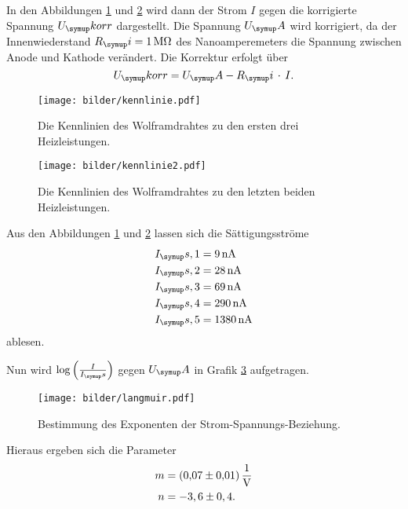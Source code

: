 In den Abbildungen \ref{fig:kenn} und \ref{fig:kenn1} wird dann der Strom $I$ gegen die korrigierte Spannung $U_\su{korr}$
dargestellt. Die Spannung $U_\su{A}$ wird korrigiert, da der Innenwiederstand
$R_\su{i} = \SI{1}{\mega\ohm}$ des Nanoamperemeters die Spannung zwischen
Anode und Kathode verändert. Die Korrektur erfolgt über
\begin{equation}
  U_\su{korr} = U_\su{A}-R_\su{i}\,\cdot\, I. \\
\end{equation}
\begin{figure}[H]
  \centering
  \texttt{[image: bilder/kennlinie.pdf]}
  \caption{Die Kennlinien des Wolframdrahtes zu den ersten drei Heizleistungen.}
  \label{fig:kenn}
\end{figure}
\begin{figure}[H]
  \centering
  \texttt{[image: bilder/kennlinie2.pdf]}
  \caption{Die Kennlinien des Wolframdrahtes zu den letzten beiden Heizleistungen.}
  \label{fig:kenn1}
\end{figure}
Aus den Abbildungen \ref{fig:kenn} und \ref{fig:kenn1} lassen sich die Sättigungsströme
\begin{align*}
  I_\su{s,1} &= \SI{9}{\nano\ampere}  \\
  I_\su{s,2} &= \SI{28}{\nano\ampere} \\
  I_\su{s,3} &= \SI{69}{\nano\ampere}  \\
  I_\su{s,4} &= \SI{290}{\nano\ampere}  \\
  I_\su{s,5} &= \SI{1380}{\nano\ampere}  \\
\end{align*}
ablesen.

Nun wird $\log{\left(\frac{I}{I_\su{s}}\right)}$ gegen $U_\su{A}$ in Grafik \ref{fig:langmuir}
aufgetragen.
\begin{figure}[H]
  \centering
  \texttt{[image: bilder/langmuir.pdf]}
  \caption{Bestimmung des Exponenten der Strom-Spannungs-Beziehung.}
  \label{fig:langmuir}
\end{figure}
Hieraus ergeben sich die Parameter
\begin{align*}
  m &= \SI[per-mode=fraction]{0,07\pm0,01}{\per\volt} \\
  n &= -3,6\pm0,4. \\
\end{align*}

